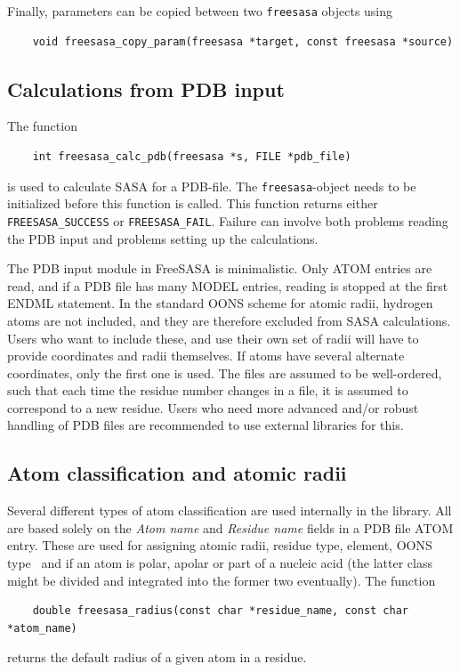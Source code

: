 \documentclass[a4paper,11pt]{article}
\begin{document}
Finally, parameters can be copied between two \verb|freesasa| objects
using
\begin{verbatim}
    void freesasa_copy_param(freesasa *target, const freesasa *source)
\end{verbatim}

\subsection{Calculations from PDB input}

The function 
\begin{verbatim}
    int freesasa_calc_pdb(freesasa *s, FILE *pdb_file)
\end{verbatim}
is used to calculate SASA for a PDB-file. The \verb|freesasa|-object
needs to be initialized before this function is called. This function
returns either \verb|FREESASA_SUCCESS| or \verb|FREESASA_FAIL|.
Failure can involve both problems reading the PDB input and problems
setting up the calculations.

The PDB input module in FreeSASA is minimalistic. Only ATOM entries
are read, and if a PDB file has many MODEL entries, reading is stopped
at the first ENDML statement. In the standard OONS scheme for atomic
radii, hydrogen atoms are not included, and they are therefore
excluded from SASA calculations. Users who want to include these, and
use their own set of radii will have to provide coordinates and radii
themselves. If atoms have several alternate coordinates, only the
first one is used. The files are assumed to be well-ordered, such that
each time the residue number changes in a file, it is assumed to
correspond to a new residue. Users who need more advanced and/or
robust handling of PDB files are recommended to use external libraries
for this.

\subsection{Atom classification and atomic radii}

Several different types of atom classification are used internally in
the library. All are based solely on the \emph{Atom name} and
\emph{Residue name} fields in a PDB file ATOM entry. These are used
for assigning atomic radii, residue type, element, OONS
type~\cite{OONS} and if an atom is polar, apolar or part of a nucleic
acid (the latter class might be divided and integrated into the former
two eventually). The function 
\begin{verbatim}
    double freesasa_radius(const char *residue_name, const char *atom_name)
\end{verbatim}
returns the default radius of a given atom in a residue.
\end{document}
